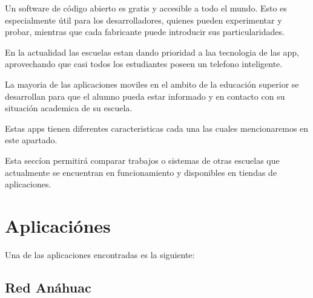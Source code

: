 Un software de código abierto es gratis y accesible a todo el mundo. Esto es especialmente útil para los 
desarrolladores, quienes pueden experimentar y probar, mientras que cada fabricante puede introducir sus 
particularidades. 


En la actualidad las escuelas estan dando prioridad a laa tecnologia de las app, aprovechando que casi 
todos los estudiantes poseen un telefono inteligente.


La mayoria de las aplicaciones moviles en el ambito de la educación superior se desarrollan para que el 
alumno pueda estar informado y en contacto con su situación academica de su escuela.

Estas apps tienen diferentes caracteristicas cada una las cuales mencionaremos en este apartado.

Esta seccíon permitirá comparar trabajos o sistemas de otras escuelas que actualmente se encuentran en 
funcionamiento y disponibles en tiendas de aplicaciones.

\section{Aplicaciónes }
Una de las aplicaciones encontradas es la siguiente:
\subsection{Red Anáhuac}




